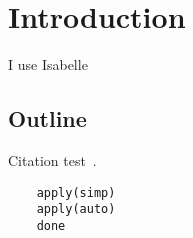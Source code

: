 
\chapter{Introduction}\label{chapter:introduction}

I use Isabelle \cite{isabelle}

\section{Outline}
Citation test~\parencite{latex}.





  \begin{lstlisting}
    apply(simp)
    apply(auto)
    done
  \end{lstlisting}
